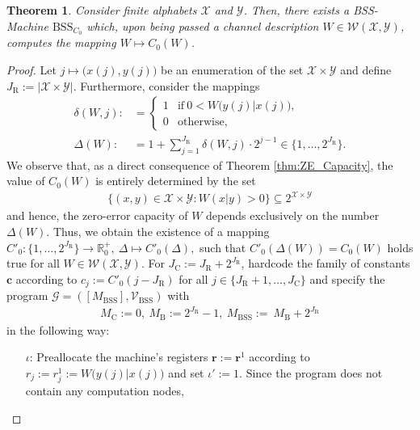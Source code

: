 \documentclass[conference]{IEEEtran}
\def\X{{\mathcal X}}
\def\Y{{\mathcal Y}}
\def\G{{\mathcal G}}
\def\V{{\mathcal V}}
\def\W{{\mathcal W}}
\def\RR{{\mathbb R}}
\newcommand{\BSS}{\mathrm{BSS}}
\newtheorem{Theorem}{Theorem}
\begin{document}
	\begin{Theorem}	\label{thm:ZeroErrorBSScomputable}
					Consider finite alphabets \(\X\) and \(\Y\). Then, there exists a BSS-Machine \(\BSS_{C_0}\)
					which, upon being passed a channel description \(W\in \W(\X,\Y)\), computes the mapping \(W \mapsto C_0(W)\).
	\end{Theorem}\begin{proof}
					Let \(j \mapsto \big(x(j), y(j)\big)\) be an enumeration of the set \(\X\times\Y\) and define
					\(J_\mathrm{R} := |\X\times \Y|\). Furthermore, consider the mappings
					\begin{align*}	\delta(W,j) :&=     \begin{cases}   1   &\text{if}~ 0 < W\big(y(j)|x(j)\big), \\
																		0   &\text{otherwise},
														\end{cases}\\
									\Delta(W)   :&=     1 + {\sum}_{j=1}^{J_\mathrm{R}} \delta(W,j)\cdot 2^{j-1} \in \big\{1,\ldots,2^{J_\mathrm{R}}\big\}.
					\end{align*} 
					We observe that, as a direct consequence of Theorem \ref{thm:ZE_Capacity}, the value of \(C_0(W)\) is 
					entirely determined by the set 
					\begin{align*}   \{(x,y) \in \X\times \Y : W(x|y) > 0\} \subseteq 2^{\X\times\Y}
					\end{align*} 
					and hence, the zero-error capacity of \(W\) depends exclusively on the number \(\Delta(W)\). Thus, we obtain the existence of a mapping
					\(C'_0 : \big\{1,\ldots,2^{J_\mathrm{R}}\big\} \rightarrow \RR_0^+,~ \Delta \mapsto C'_0(\Delta),        
					\)
					such that \(C'_0(\Delta(W)) = C_0(W)\) holds true for all \(W\in\W(\X,\Y)\). For \(J_\mathrm{C} := J_\mathrm{R} + 2^{J_\mathrm{R}}\), 
					hardcode the family of constants \(\bm{c}\) according to 
					\(  c_j := C'_0(j - J_\mathrm{R})
					\)
					for all \(j\in \{J_\mathrm{R} + 1, \ldots, J_\mathrm{C}\}\) and specify the program \(\G = ([M_\BSS],\V_\BSS)\) with
					\begin{align*}	M_\mathrm{C} := 0,~M_\mathrm{B} := 2^{J_\mathrm{R}} - 1,~ M_\BSS := ~M_\mathrm{B} + 2^{J_\mathrm{R}}
					\end{align*}
					in the following way:
					\begin{enumerate}	\item[\(\iota\)\hspace{1pt}:] Preallocate the machine's registers \(\bm{r} := \bm{r}^1\) according to
											\(r_j := r^1_j := W\big(y(j)|x(j)\big)\) and set \(\iota' := 1\). Since the program does not contain any computation nodes,

\end{enumerate}
\end{proof}
\end{document}
